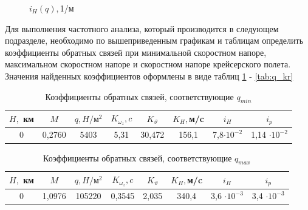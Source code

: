 \begin{figure}[H]
        \caption{$i_H(q), $1/м}
        \label{fig:i_H}
    \end{figure} 
    

Для выполнения частотного анализа, который производится в следующем подразделе, необходимо по вышеприведенным графикам и таблицам определить коэффициенты обратных связей при минимальной скоростном напоре, максимальном скоростном напоре и скоростном напоре крейсерского полета. Значения найденных коэффициентов оформлены в виде таблиц \ref{tab:q_min} - \ref{tab:q_kr}


\begin{table}[H]
    \centering
    \caption{Коэффициенты обратных связей, соответствующие $q_{min}$}
    \begin{tabular}{|c|c|c|c|c|c|c|c|}
    \hline
        $H,$ км & $M$ & $q, H / \text{м}^2$ & $K_{\omega_z}, c$ & $K_\vartheta$ & $K_H,$м/c &$i_H$&$i_p$\\ \hline
        0& 0,2760& 5403  &5,31 & 30,472&156,1 &7,8$\cdot 10^{-2}$&1,14 $\cdot 10^{-2}$\\ \hline
    \end{tabular}
    \label{tab:q_min}
\end{table}

\begin{table}[H]
    \centering
    \caption{Коэффициенты обратных связей, соответствующие $q_{max}$}
    \begin{tabular}{|c|c|c|c|c|c|c|c|}
    \hline
        $H,$ км & $M$ & $q, H / \text{м}^2$ & $K_{\omega_z}, c$ & $K_\vartheta$ & $K_H,$м/c &$i_H$&$i_p$ \\ \hline
        0& 1,0976 &105220& 0,3545 & 2,035&340,4&3,6 $\cdot 10^{-3}$&3,4 $\cdot 10^{-3}$\\ \hline
    \end{tabular}
    \label{tab:q_max}
\end{table}


